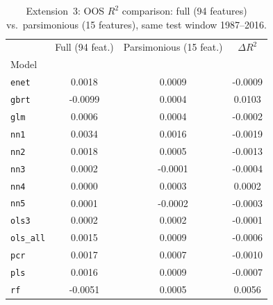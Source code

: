\begin{table}[H]
\centering
\caption{Extension~3: OOS $R^2$ comparison: full (94 features) vs.\ parsimonious (15 features), same test window 1987--2016.}
\label{tab:parsimony}
\begin{tabular}{lccc}
\toprule
 & Full (94 feat.) & Parsimonious (15 feat.) & $\Delta R^2$ \\
Model &  &  &  \\
\midrule
\texttt{enet} & 0.0018 & 0.0009 & -0.0009 \\
\texttt{gbrt} & -0.0099 & 0.0004 & 0.0103 \\
\texttt{glm} & 0.0006 & 0.0004 & -0.0002 \\
\texttt{nn1} & 0.0034 & 0.0016 & -0.0019 \\
\texttt{nn2} & 0.0018 & 0.0005 & -0.0013 \\
\texttt{nn3} & 0.0002 & -0.0001 & -0.0004 \\
\texttt{nn4} & 0.0000 & 0.0003 & 0.0002 \\
\texttt{nn5} & 0.0001 & -0.0002 & -0.0003 \\
\texttt{ols3} & 0.0002 & 0.0002 & -0.0001 \\
\texttt{ols\_all} & 0.0015 & 0.0009 & -0.0006 \\
\texttt{pcr} & 0.0017 & 0.0007 & -0.0010 \\
\texttt{pls} & 0.0016 & 0.0009 & -0.0007 \\
\texttt{rf} & -0.0051 & 0.0005 & 0.0056 \\
\bottomrule
\end{tabular}
\end{table}
